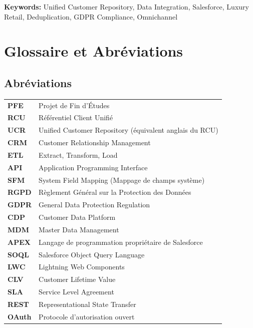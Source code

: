 \documentclass[12pt,a4paper,openany,oneside]{report}
\begin{document}
\vspace{0.5cm}
\noindent\textbf{Keywords:} Unified Customer Repository, Data Integration, Salesforce, Luxury Retail, Deduplication, GDPR Compliance, Omnichannel

\cleardoublepage
\thispagestyle{plain}
\tableofcontents
\cleardoublepage

\listoffigures
\cleardoublepage

\listoftables
\cleardoublepage

\cleardoublepage
\chapter*{Glossaire et Abréviations}
\thispagestyle{plain}

\section*{Abréviations}
\begin{tabular}{ll}
    \textbf{PFE} & Projet de Fin d'Études \\
    \textbf{RCU} & Référentiel Client Unifié \\
    \textbf{UCR} & Unified Customer Repository (équivalent anglais du RCU) \\
    \textbf{CRM} & Customer Relationship Management \\
    \textbf{ETL} & Extract, Transform, Load \\
    \textbf{API} & Application Programming Interface \\
    \textbf{SFM} & System Field Mapping (Mappage de champs système) \\
    \textbf{RGPD} & Règlement Général sur la Protection des Données \\
    \textbf{GDPR} & General Data Protection Regulation \\
    \textbf{CDP} & Customer Data Platform \\
    \textbf{MDM} & Master Data Management \\
    \textbf{APEX} & Langage de programmation propriétaire de Salesforce \\
    \textbf{SOQL} & Salesforce Object Query Language \\
    \textbf{LWC} & Lightning Web Components \\
    \textbf{CLV} & Customer Lifetime Value \\
    \textbf{SLA} & Service Level Agreement \\
    \textbf{REST} & Representational State Transfer \\
    \textbf{OAuth} & Protocole d'autorisation ouvert \\
\end{tabular}
\end{document}
